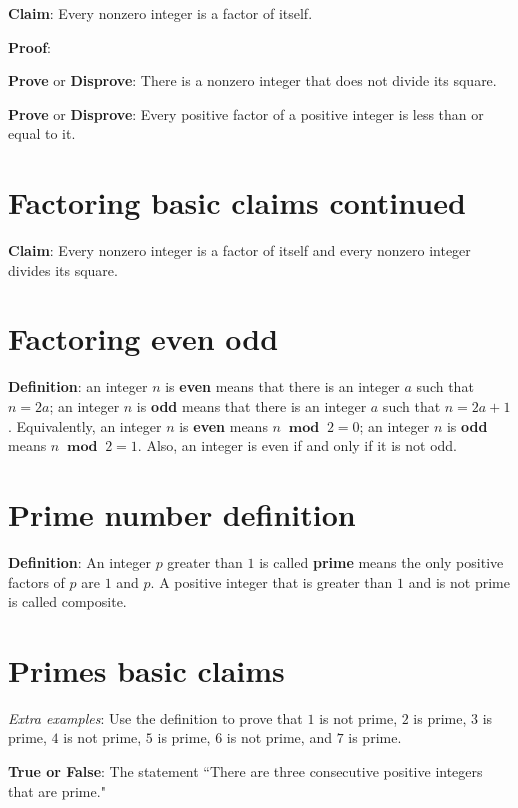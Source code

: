 \documentclass[12pt, oneside]{article}
\begin{document}
{\bf Claim}: Every nonzero integer is a factor of itself.

{\bf Proof}: 


\vfill

{\bf Prove} or {\bf Disprove}: There is a nonzero integer that does not divide its square.



\vfill

{\bf Prove} or {\bf Disprove}: Every positive factor of a positive integer is less than or equal to it.

\vfill \vfill
\section*{Factoring basic claims continued}


{\bf Claim}: Every nonzero integer is a factor of itself and 
every nonzero integer divides its square.

\vfill \vfill
\section*{Factoring even odd}


{\bf Definition}: an integer $n$ is {\bf even} means that there is an integer $a$ such that $n = 2a$; 
an integer $n$ is {\bf odd} means that there is an integer $a$ such that $n = 2a+1$.  Equivalently, 
an integer $n$ is {\bf even} means $n ~\textbf{ mod }~2 = 0$; an integer $n$ is {\bf odd} means $n ~\textbf{ mod }~2 = 1$.  
Also, an integer is even if and only if it is not odd.
 \vfill
\section*{Prime number definition}


{\bf Definition}:  An integer $p$ greater than $1$ is called {\bf prime} means 
the only positive factors of 
$p$ are $1$ and $p$. A positive integer that is greater than $1$ and is not prime 
is called composite. \vfill
\section*{Primes basic claims}


{\it Extra examples}: Use the definition to prove that $1$ is not prime, $2$ is prime, $3$
is prime, $4$ is not prime, $5$ is prime, $6$ is not prime, and $7$ is prime.


{\bf True or False}: The statement ``There are three consecutive positive integers that are prime."
\end{document}

